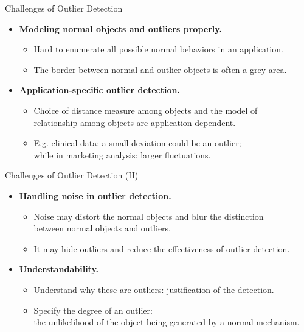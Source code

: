 \begin{frame}{Challenges of Outlier Detection}
	\begin{itemize}
		\item \textbf{Modeling normal objects and outliers properly.}
		      \begin{itemize}
			      \item Hard to enumerate all possible normal behaviors in an application.
			      \item The border between normal and outlier objects is often a grey area.
		      \end{itemize}
		\item \textbf{Application-specific outlier detection.}
		      \begin{itemize}
			      \item Choice of distance measure among objects and the model of \\
			            relationship among objects are application-dependent.
			      \item E.g. clinical data: a small deviation could be an outlier; \\
			            while in marketing analysis: larger fluctuations.
		      \end{itemize}
	\end{itemize}
\end{frame}


\begin{frame}{Challenges of Outlier Detection (II)}
	\begin{itemize}
		\item \textbf{Handling noise in outlier detection.}
		      \begin{itemize}
			      \item Noise may distort the normal objects and blur the distinction \\
			            between normal objects and outliers.
			      \item It may hide outliers and reduce the effectiveness of outlier detection.
		      \end{itemize}
		\item \textbf{Understandability.}
		      \begin{itemize}
			      \item Understand why these are outliers: justification of the detection.
			      \item Specify the degree of an outlier: \\
			            the unlikelihood of the object being generated by a normal mechanism.
		      \end{itemize}
	\end{itemize}
\end{frame}
